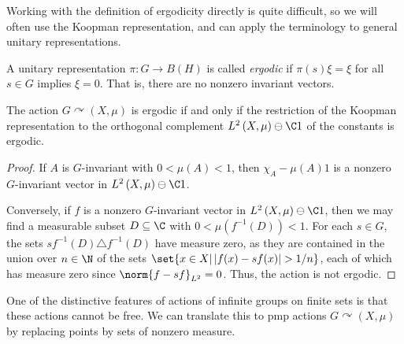 \documentclass[10pt]{mypackage}
\begin{document}
Working with the definition of ergodicity directly is quite difficult, so we will often use the Koopman representation, and can apply the terminology to general unitary representations.
\begin{definition}
  A unitary representation $\pi\colon G\rightarrow B\left( H \right)$ is called \textit{ergodic} if $\pi(s)\xi = \xi$ for all $s\in G$ implies $\xi = 0$. That is, there are no nonzero invariant vectors.
\end{definition}
\begin{proposition}
  The action $G\curvearrowright \left( X,\mu \right)$ is ergodic if and only if the restriction of the Koopman representation to the orthogonal complement $L^2\left( X,\mu \right)\ominus \C 1$ of the constants is ergodic.
\end{proposition}
\begin{proof}
  If $A$ is $G$-invariant with $0 < \mu(A) < 1$, then $\chi_A-\mu(A)1$ is a nonzero $G$-invariant vector in $L^2\left( X,\mu \right)\ominus \C 1$.

  Conversely, if $f$ is a nonzero $G$-invariant vector in $L^2\left( X,\mu \right)\ominus \C1$, then we may find a measurable subset $D\subseteq \C$ with $0 < \mu\left( f^{-1}\left( D \right) \right) < 1$. For each $s\in G$, the sets $sf^{-1}\left( D \right)\triangle f^{-1}\left( D \right)$ have measure zero, as they are contained in the union over $n\in \N$ of the sets $\set{x\in X | \left\vert f(x)-sf(x) \right\vert > 1/n}$, each of which has measure zero since $\norm{f - sf}_{L^2} = 0$. Thus, the action is not ergodic.
\end{proof}
One of the distinctive features of actions of infinite groups on finite sets is that these actions cannot be free. We can translate this to pmp actions $G\curvearrowright \left( X,\mu \right)$ by replacing points by sets of nonzero measure.
\end{document}
